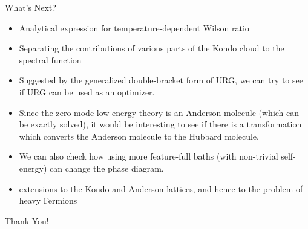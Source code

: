 \documentclass[aspectratio=169]{beamer}
\begin{document}
\begin{frame}{What's Next?}
\begin{itemize} 
\item Analytical expression for temperature-dependent Wilson ratio 
	\vspace{5pt}
\item Separating the contributions of various parts of the Kondo cloud to the spectral function
	\vspace{5pt}
\item Suggested by the generalized double-bracket form of URG, we can try to see if URG can be used as an optimizer.
	\vspace{5pt}
\item Since the zero-mode low-energy theory is an Anderson molecule (which can be exactly solved), it would be interesting to see if there is a transformation which converts the Anderson molecule to the Hubbard molecule.
	\vspace{5pt}
\item We can also check how using more feature-full baths (with non-trivial self-energy) can change the phase diagram.
	\vspace{5pt}
\item extensions to the Kondo and Anderson lattices, and hence to the problem of heavy Fermions
\end{itemize}
\end{frame}
\begin{frame}
	\LARGE \centering Thank You!
\end{frame}
\printbibliography
% 
\end{document}
